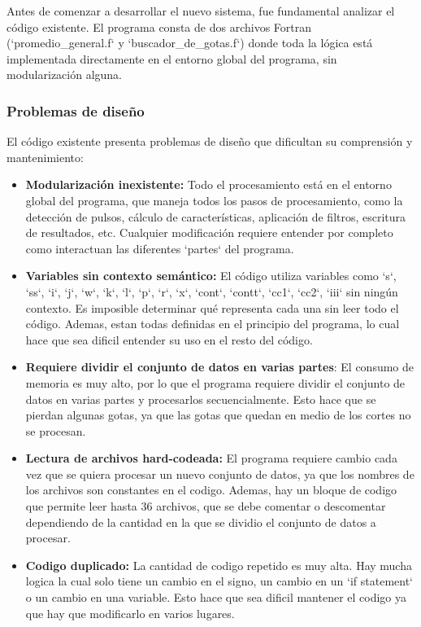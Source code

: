 \documentclass[12pt,a4paper]{article}
\begin{document}
Antes de comenzar a desarrollar el nuevo sistema, fue fundamental analizar el código existente. El programa consta de dos archivos Fortran (`promedio\_general.f` y `buscador\_de\_gotas.f`) donde toda la lógica está implementada directamente en el entorno global del programa, sin modularización alguna. 

\subsubsection{Problemas de diseño}

El código existente presenta problemas de diseño que dificultan su comprensión y mantenimiento:

\begin{itemize}

\item \textbf{Modularización inexistente:} Todo el procesamiento está en el entorno global del programa, que maneja todos los pasos de procesamiento, como la detección de pulsos, cálculo de características, aplicación de filtros, escritura de resultados, etc. Cualquier modificación requiere entender por completo como interactuan las diferentes `partes` del programa.

\item \textbf{Variables sin contexto semántico:} El código utiliza variables como `s`, `ss`, `i`,
`j`, `w`, `k`, `l`, `p`, `r`, `x`, `cont`, `contt`, `cc1`, `cc2`, `iii` sin ningún contexto. Es
imposible determinar qué representa cada una sin leer todo el código. Ademas, estan todas definidas en el principio del programa, lo cual hace que sea dificil entender su uso en el resto del código.
    
\item \textbf{Requiere dividir el conjunto de datos en varias partes}: El consumo de memoria es muy alto, por lo que el programa requiere dividir el conjunto de datos en varias partes y procesarlos secuencialmente. Esto hace que se pierdan algunas gotas, ya que las gotas que quedan en medio de los cortes no se procesan.

\item \textbf{Lectura de archivos hard-codeada:} El programa requiere cambio cada vez que se quiera procesar un nuevo conjunto de datos, ya que los nombres de los archivos son constantes en el codigo. Ademas, hay un bloque de codigo que permite leer hasta 36 archivos, que se debe comentar o descomentar dependiendo de la cantidad en la que se dividio el conjunto de datos a procesar.

\item \textbf{Codigo duplicado:} La cantidad de codigo repetido es muy alta. Hay mucha logica la cual solo tiene un cambio en el signo, un cambio en un `if statement` o un cambio en una variable. Esto hace que sea dificil mantener el codigo ya que hay que modificarlo en varios lugares.

\end{itemize}
\end{document}
